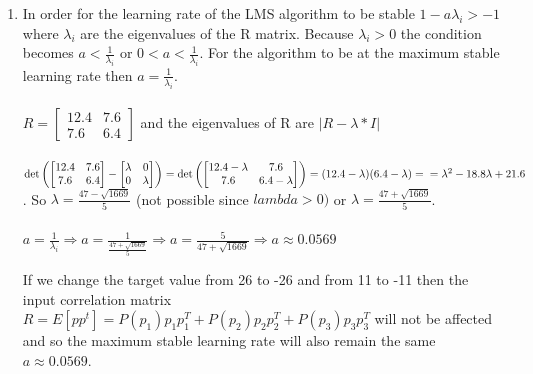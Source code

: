 \documentclass{article}
\begin{document}
\begin{enumerate}[label=\Alph*]
    
  \item In order for the learning rate of the LMS algorithm to be stable ${1-a\lambda_i > -1}$ where ${\lambda_i}$ are the eigenvalues of the R matrix. Because ${\lambda_i > 0}$ the condition becomes
  ${a < \frac{1}{\lambda_i}}$ or ${0 < a < \frac{1}{\lambda_i}}$. For the algorithm to be at the maximum stable learning rate then ${a = \frac{1}{\lambda_i}}$. 
  \\ \\ $R = \begin{bmatrix}
    12.4 & 7.6 \\
    7.6 & 6.4
  \end{bmatrix} $
  and the eigenvalues of R are ${|R - \lambda*I|}$ \\
  \\$\det \left ( \begin{bmatrix}
    12.4 & 7.6 \\
    7.6 & 6.4
  \end{bmatrix} 
  -\begin{bmatrix}
    \lambda & 0 \\
    0 & \lambda
  \end{bmatrix} \right )  = 
  \det \left (\begin{bmatrix}
    12.4-\lambda & 7.6 \\
    7.6 & 6.4-\lambda
\end{bmatrix} \right ) = (12.4-\lambda)(6.4-\lambda) = \\ \\ =\lambda^2 - 18.8\lambda + 21.6$
. So ${\lambda = \frac{47 - \sqrt{1669} }{5}}$ (not possible since ${lambda > 0})$ or ${\lambda = \frac{47 + \sqrt{1669} }{5}}$.
\\ \\ ${a = \frac{1}{\lambda_i} \Rightarrow a= \frac{1}{\frac{47 + \sqrt{1669} }{5}}} \Rightarrow a = \frac{5}{47+\sqrt{1669}} \Rightarrow a \approx 0.0569 $

If we change the target value from 26 to -26 and from 11 to -11 then the input correlation matrix 
$R = E[pp^t] = P(p_1)p_1p_1^T + P(p_2)p_2p_2^T + P(p_3)p_3p_3^T$ will not be affected and so the maximum stable learning rate will also remain the same ${a \approx 0.0569}$.


\end{enumerate}
\end{document}
